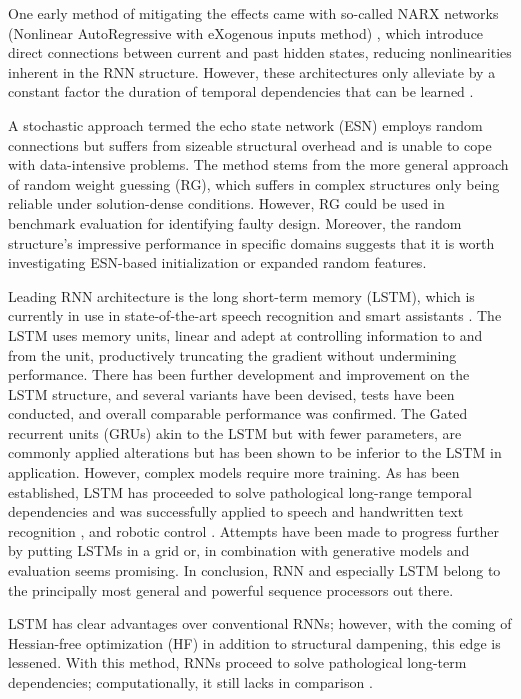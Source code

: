 One early method of mitigating the effects came with so-called NARX networks (Nonlinear AutoRegressive with eXogenous inputs method) \cite{DRNNS}, which introduce direct connections between current and past hidden states, reducing nonlinearities inherent in the RNN structure. However, these architectures only alleviate by a constant factor the duration of temporal dependencies that can be learned \cite{suts}.

A stochastic approach termed the echo state network (ESN) employs random connections but suffers from sizeable structural overhead and is unable to cope with data-intensive problems. The method stems from the more general approach of random weight guessing (RG), which suffers in complex structures only being reliable under solution-dense conditions. However, RG could be used in benchmark evaluation for identifying faulty design. Moreover, the random structure's impressive performance in specific domains suggests that it is worth investigating ESN-based initialization \cite{suts} or expanded random features. 

Leading RNN architecture is the long short-term memory \cite{LSTM} (LSTM), which is currently in use in state-of-the-art speech recognition and smart assistants \cite{Apple}. The LSTM uses memory units, linear and adept at controlling information to and from the unit, productively truncating the gradient without undermining performance. There has been further development and improvement on the LSTM structure, and several variants have been devised, tests have been conducted, and overall comparable performance was confirmed\cite{Greff}. The Gated recurrent units (GRUs) akin to the LSTM but with fewer parameters, are commonly applied alterations but has been shown to be inferior to the LSTM in application. However, complex models require more training. As has been established, LSTM has proceeded to solve pathological long-range temporal dependencies and was successfully applied to speech and handwritten text recognition \cite{gs, gas}, and robotic control \cite{mayer}. Attempts have been made to progress further by putting LSTMs in a grid\cite{ka} or, in combination with generative models and evaluation seems promising\cite{gr, ch, bo}. In conclusion, RNN and especially LSTM belong to the principally most general and powerful sequence processors out there.

LSTM has clear advantages over conventional RNNs; however, with the coming of Hessian-free optimization (HF) in addition to structural dampening, this edge is lessened. With this method, RNNs proceed to solve pathological long-term dependencies; computationally, it still lacks in comparison \cite{suts}. 

